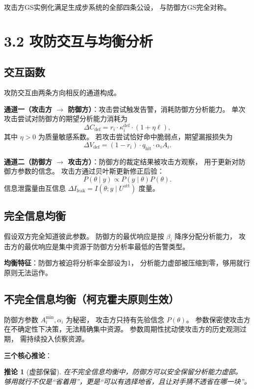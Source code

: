 \documentclass[11pt,a4paper]{article}
\newtheorem{corollary}{推论}[section]
\begin{document}
攻击方GS实例化满足生成步系统的全部四条公设，
与防御方GS完全对称。

\section{3.2 攻防交互与均衡分析}

\subsection{交互函数}

攻防交互由两条方向相反的通道构成。

\textbf{通道一（攻击方 $\to$ 防御方）}：攻击尝试触发告警，消耗防御方分析能力。
单次攻击尝试对防御方的期望分析能力消耗为
\[
\Delta C_{\text{def}} = r_i \cdot \kappa_i^{\text{def}} \cdot (1 + \eta \ell),
\]
其中 $\eta > 0$ 为质量敏感系数。
若攻击尝试恰好命中脆弱点，期望漏报损失为
\[
\Delta V_{\text{def}} = (1 - r_i) \cdot q_{\text{hit}} \cdot \alpha_i A_i.
\]

\textbf{通道二（防御方 $\to$ 攻击方）}：防御方的裁定结果被攻击方观察，
用于更新对防御方参数的信念。
攻击方通过贝叶斯更新修正后验：
\[
P(\theta \mid y) \propto P(y \mid \theta) P(\theta).
\]
信息泄露量由互信息 $\Delta I_{\text{leak}} = I(\theta; y \mid U^{\text{att}})$ 度量。

\subsection{完全信息均衡}

假设双方完全知道彼此参数。
防御方的最优响应是按 $\beta_i$ 降序分配分析能力，
攻击方的最优响应是集中资源于防御方分析率最低的告警类型。

\textbf{均衡特征}：防御方被迫将分析率全部设为1，
分析能力虚部被压缩到零，够用就行原则无法运作。

\subsection{不完全信息均衡（柯克霍夫原则生效）}

防御方参数 $A_i^{\min}, \alpha_i$ 为秘密，
攻击方只持有先验信念 $P(\theta)$。
参数保密使攻击方在不确定性下决策，无法精确集中资源。
参数周期性扰动使攻击方的历史观测过期，
需持续投入侦察资源。

\textbf{三个核心推论}：

\begin{corollary}[虚部保留]
在不完全信息均衡中，防御方可以安全保留分析能力虚部。
够用就行不仅是“省着用”，更是“可以有选择地省，且让对手猜不透省在哪一块”。
\end{corollary}
\end{document}
